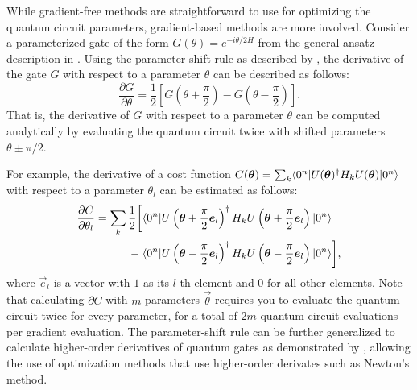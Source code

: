 While gradient-free methods are straightforward to use for optimizing the quantum circuit parameters, gradient-based methods are more involved.
Consider a parameterized gate of the form $G(\theta) = e^{-i\theta/2 H}$ from the general ansatz description in .
Using the parameter-shift rule as described by \textcite{schuld2019evaluating}, the derivative of the gate $G$ with respect to a parameter $\theta$ can be described as follows:
\begin{equation}
\dfrac{\partial G}{\partial \theta} = \dfrac{1}{2}\left[G\left(\theta + \dfrac{\pi}{2}\right) - G\left(\theta - \dfrac{\pi}{2}\right)\right].
\end{equation}
That is, the derivative of $G$ with respect to a parameter $\theta$ can be computed analytically by evaluating the quantum circuit twice with shifted parameters $\theta \pm \pi/2$.

For example, the derivative of a cost function $C(\bm{\theta}) = \sum_k \langle{0^n}\vert U(\bm{\theta})^\dagger H_k U(\bm{\theta})\vert{0^n}\rangle$ with respect to a parameter $\theta_l$ can be estimated as follows:
\begin{equation}
\begin{aligned}
\dfrac{\partial C}{\partial \theta_l} = \sum_k \dfrac{1}{2} \bigg[&\langle{0^n}\vert U\left(\bm{\theta} + \dfrac{\pi}{2}\bm{e}_l\right)^\dagger H_k U\left(\bm{\theta} + \dfrac{\pi}{2}\bm{e}_l\right)\vert{0^n}\rangle \\
- \; &\langle{0^n}\vert U\left(\bm{\theta} - \dfrac{\pi}{2}\bm{e}_l\right)^\dagger H_k U\left(\bm{\theta} - \dfrac{\pi}{2}\bm{e}_l\right)\vert{0^n}\rangle\bigg],
\end{aligned}
\end{equation}
where $\vec{e}_l$ is a vector with $1$ as its $l$-th element and $0$ for all other elements.
Note that calculating $\partial C$ with $m$ parameters $\vec{\theta}$ requires you to evaluate the quantum circuit twice for every parameter, for a total of $2m$ quantum circuit evaluations per gradient evaluation.
The parameter-shift rule can be further generalized to calculate higher-order derivatives of quantum gates as demonstrated by \textcite{mari2021estimating}, allowing the use of optimization methods that use higher-order derivates such as Newton's method.

